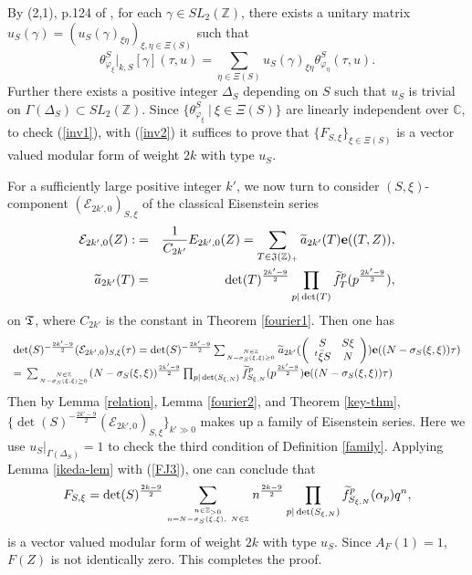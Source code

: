 \documentclass[11pt]{amsart}
\numberwithin{equation}{section}
\theoremstyle{definition}
\begin{document}
By (2,1), p.124 of \cite{takase}, for each $\gamma\in SL_2({\mathbb{Z}})$, there exists a unitary matrix $u_S(\gamma)=
(u_S(\gamma)_{\xi \eta})_{\xi,\eta\in \Xi(S)}$ such that 
\begin{equation}\label{inv2}
\theta^S_{\varphi_\xi}|_{k,S}[\gamma](\tau,u)=\sum_{\eta\in \Xi(S)}u_S(\gamma)_{\xi\eta}\theta^S_{\varphi_\eta}(\tau,u).
\end{equation}
Further there exists a positive integer $\Delta_S$ depending on $S$ such that $u_S$ is trivial on $\Gamma(\Delta_S)\subset SL_2({\mathbb{Z}})$.
Since $\{ \theta^S_{\varphi_\xi}\ |\  \xi\in \Xi(S) \}$ are linearly independent over ${\mathbb{C}}$, 
to check (\ref{inv1}), with (\ref{inv2}) it suffices to prove that $\{F_{S,\xi}\}_{\xi\in \Xi(S)}$ is a vector 
valued modular form of weight $2k$ with type $u_S$. 

For a sufficiently large positive integer $k'$, 
we now turn to consider $(S,\xi)$-component $(\mathcal{E}_{2k',0})_{S,\xi}$ of the classical 
Eisenstein series  
\begin{eqnarray*} \mathcal{E}_{2k',0}(Z):&=&\frac{1}{C_{2k'}}E_{2k',0}(Z)=\sum_{T\in \frak J({\mathbb{Z}})_+}\widetilde{a}_{2k'}(T)\bold{e}((T,Z)),\\
\widetilde{a}_{2k'}(T)&=&\det(T)^{\frac{2k'-9}{2}}\prod_{p|\det(T)}\widetilde{f}^p_T(p^{\frac{2k'-9}{2}}),
\end{eqnarray*}
on $\frak T$, where $C_{2k'}$ is the constant in Theorem \ref{fourier1}. Then one has 
$$
\begin{array}{l}
\det(S)^{-\frac{2k'-9}{2}}(\mathcal{E}_{2k',0})_{S,\xi}(\tau)
=\det(S)^{-\frac{2k'-9}{2}}
{\displaystyle}\sum_{N\in {\mathbb{Z}} \atop N-\sigma_S(\xi,\xi)\ge 0}
\widetilde{a}_{2k'}(\left(\begin{array}{cc}
S & S\xi \\
{}^t\bar{\xi}S & N 
\end{array}\right))\bold{e}((N-\sigma_S(\xi,\xi))\tau)\\
=
{\displaystyle}\sum_{N\in {\mathbb{Z}} \atop N-\sigma_S(\xi,\xi)\ge 0}(N-\sigma_S(\xi,\xi))^{\frac{2k'-9}{2}}
\prod_{p|\det(S_{\xi,N})}\widetilde{f}^p_{S_{\xi,N}}(p^{\frac{2k'-9}{2}})\bold{e}((N-\sigma_S(\xi,\xi))\tau)\\
\end{array}
$$
Then by Lemma \ref{relation}, Lemma \ref{fourier2}, and Theorem \ref{key-thm}, 
$\{\det(S)^{-\frac{2k'-9}{2}}(\mathcal{E}_{2k',0})_{S,\xi}\}_{k'\gg0}$ makes up a family of Eisenstein series. 
Here we use $u_S|_{\Gamma(\Delta_S)}=1$ to check the third condition of Definition \ref{family}.  
Applying Lemma \ref{ikeda-lem} with (\ref{FJ3}), one can conclude that
$$F_{S,\xi}=\det(S)^{\frac{2k-9}{2}}{\displaystyle}\sum_{n\in{\mathbb{Z}}_{>0}\atop 
n=N-\sigma_S(\xi,\xi),\ N\in {\mathbb{Z}}} n^{\frac{2k-9}{2}} \prod_{p|\det(S_{\xi,N})}\widetilde{f}^p_{S_{\xi,N}}(\alpha_p) q^n,
$$ 
is 
a vector valued modular form of weight $2k$ with type $u_S$. 
Since $A_F(1)=1$, $F(Z)$ is not identically zero. 
This completes the proof. 
\end{document}
